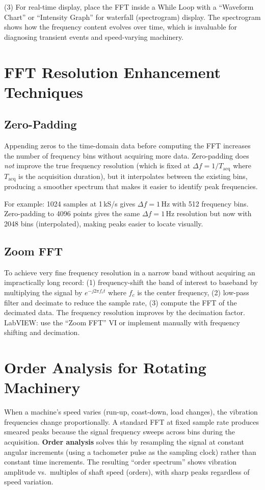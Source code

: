 \documentclass[11pt,letterpaper,twoside,openany]{book}
\begin{document}
(3) For real-time display, place the FFT inside a While Loop with a ``Waveform Chart'' or ``Intensity Graph'' for waterfall (spectrogram) display. The spectrogram shows how the frequency content evolves over time, which is invaluable for diagnosing transient events and speed-varying machinery.
\section{FFT Resolution Enhancement Techniques}
\subsection{Zero-Padding}
Appending zeros to the time-domain data before computing the FFT increases the number of frequency bins without acquiring more data. Zero-padding does \emph{not} improve the true frequency resolution (which is fixed at $\Delta f = 1/T_{\text{acq}}$ where $T_{\text{acq}}$ is the acquisition duration), but it interpolates between the existing bins, producing a smoother spectrum that makes it easier to identify peak frequencies.

For example: 1024 samples at 1\,kS/s gives $\Delta f = 1$\,Hz with 512 frequency bins. Zero-padding to 4096 points gives the same $\Delta f = 1$\,Hz resolution but now with 2048 bins (interpolated), making peaks easier to locate visually.

\subsection{Zoom FFT}
To achieve very fine frequency resolution in a narrow band without acquiring an impractically long record: (1) frequency-shift the band of interest to baseband by multiplying the signal by $e^{-j2\pi f_c t}$ where $f_c$ is the center frequency, (2) low-pass filter and decimate to reduce the sample rate, (3) compute the FFT of the decimated data. The frequency resolution improves by the decimation factor. LabVIEW: use the ``Zoom FFT'' VI or implement manually with frequency shifting and decimation.

\section{Order Analysis for Rotating Machinery}
When a machine's speed varies (run-up, coast-down, load changes), the vibration frequencies change proportionally. A standard FFT at fixed sample rate produces smeared peaks because the signal frequency sweeps across bins during the acquisition. \textbf{Order analysis} solves this by resampling the signal at constant angular increments (using a tachometer pulse as the sampling clock) rather than constant time increments. The resulting ``order spectrum'' shows vibration amplitude vs.\ multiples of shaft speed (orders), with sharp peaks regardless of speed variation.
\end{document}
